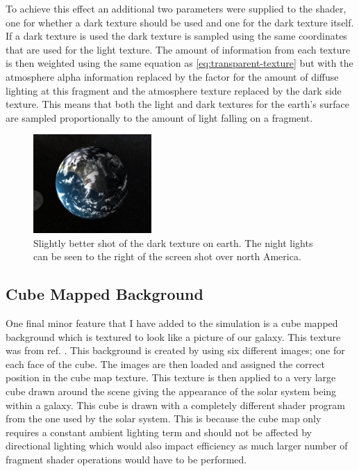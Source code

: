 \documentclass[conference]{IEEEtran}
\begin{document}
To achieve this effect an additional two parameters were supplied to the shader, one for whether a dark texture should be used and one for the dark texture itself. If a dark texture is used the dark texture is sampled using the same coordinates that are used for the light texture. The amount of information from each texture is then weighted using the same equation as \ref{eq:transparent-texture} but with the atmosphere alpha information replaced by the factor for the amount of diffuse lighting at this fragment and the atmosphere texture replaced by the dark side texture. This means that both the light and dark textures for the earth's surface are sampled proportionally to the amount of light falling on a fragment.

\begin{figure}[!t]
\centering
\includegraphics[width=0.4\textwidth]{img/earth_dark.png}
\caption{Slightly better shot of the dark texture on earth. The night lights can be seen to the right of the screen shot over north America.}
\label{fig:earth-dark}
\end{figure}

\subsection{Cube Mapped Background}
One final minor feature that I have added to the simulation is a cube mapped background which is textured to look like a picture of our galaxy. This texture was from ref. \cite{galaxytexture}. This background is created by using six different images; one for each face of the cube. The images are then loaded and assigned the correct position in the cube map texture. This texture is then applied to a very large cube drawn around the scene giving the appearance of the solar system being within a galaxy. This cube is drawn with a completely different shader program from the one used by the solar system. This is because the cube map only requires a constant ambient lighting term and should not be affected by directional lighting which would also impact efficiency as much larger number of fragment shader operations would have to be performed.
\end{document}
